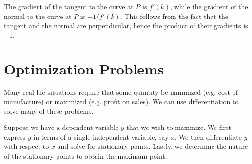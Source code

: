 \begin{figure}[H]
    \centering
    \caption{}
\end{figure}

The gradient of the tangent to the curve at $P$ is $f'(k)$, while the gradient of the normal to the curve at $P$ is $-1/f'(k)$. This follows from the fact that the tangent and the normal are perpendicular, hence the product of their gradients is $-1$.

\section{Optimization Problems}

Many real-life situations require that some quantity be minimized (e.g. cost of manufacture) or maximized (e.g. profit on sales). We can use differentiation to solve many of these problems.

\begin{recipe}
    Suppose we have a dependent variable $y$ that we wish to maximize. We first express $y$ in terms of a single independent variable, say $x$. We then differentiate $y$ with respect to $x$ and solve for stationary points. Lastly, we determine the nature of the stationary points to obtain the maximum point.
\end{recipe}

